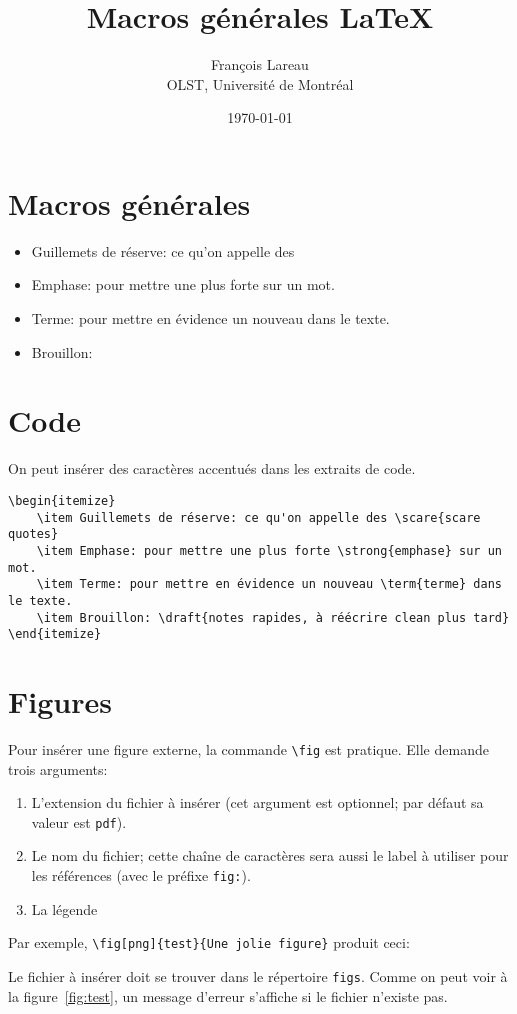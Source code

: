 \documentclass{article}
\title{Macros générales \LaTeX}
\author{François Lareau\\OLST, Université de Montréal}
\date{\today}
\begin{document}
\maketitle

\section{Macros générales}

\begin{itemize}
	\item Guillemets de réserve: ce qu'on appelle des 
	\item Emphase: pour mettre une plus forte  sur un mot.
	\item Terme: pour mettre en évidence un nouveau  dans le texte.
	\item Brouillon: 
\end{itemize}


\section{Code}

On peut insérer des caractères accentués dans les extraits de code.

\begin{lstlisting}
\begin{itemize}
	\item Guillemets de réserve: ce qu'on appelle des \scare{scare quotes}
	\item Emphase: pour mettre une plus forte \strong{emphase} sur un mot.
	\item Terme: pour mettre en évidence un nouveau \term{terme} dans le texte.
	\item Brouillon: \draft{notes rapides, à réécrire clean plus tard}
\end{itemize}
\end{lstlisting}


\section{Figures}

Pour insérer une figure externe, la commande \lstinline{\fig} est pratique. Elle demande trois arguments:

\begin{enumerate}
	\item L'extension du fichier à insérer (cet argument est optionnel; par défaut sa valeur est \lstinline{pdf}).
	\item Le nom du fichier; cette chaîne de caractères sera aussi le label à utiliser pour les références (avec le préfixe \lstinline{fig:}).
	\item La légende
\end{enumerate}

Par exemple, \lstinline|\fig[png]{test}{Une jolie figure}| produit ceci:


Le fichier à insérer doit se trouver dans le répertoire \lstinline{figs}. Comme on peut voir à la figure~\ref{fig:test}, un message d'erreur s'affiche si le fichier n'existe pas.
\end{document}
